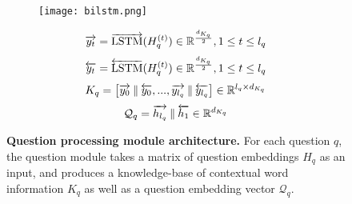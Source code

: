 \begin{figure}[htbp]
    \centering
    \begin{subfigure}[l]{0.4\textwidth}
    \texttt{[image: bilstm.png]}
    \end{subfigure}
    \begin{subfigure}[r]{0.59\textwidth}
        \begin{equation}
            \overrightarrow{y_t} = \overrightarrow{\text{LSTM}}(H_q^{(t)}) \in \mathbb{R}^\frac{d_{K_q}}{2}, 1 \leq t \leq l_q\\
            \label{equation:question_module_forward_y_t}
        \end{equation}
        \begin{equation}
            \overleftarrow{y_t} = \overleftarrow{\text{LSTM}}(H_q^{(t)}) \in \mathbb{R}^\frac{d_{K_q}}{2}, 1 \leq t \leq l_q\\
            \label{equation:question_module_backward_y_t}
        \end{equation}
        \begin{equation}
            K_q = \left [ \overrightarrow{y_0} \mathbin\Vert \overleftarrow{y_0}, ..., \overrightarrow{y_{l_q}} \mathbin\Vert \overleftarrow{y_{l_q}}\right] \in \mathbb{R}^{l_q \times d_{K_q}}\\
            \label{equation:question_module_K_q}
        \end{equation}
        \begin{equation}
            \mathcal{Q}_q = \overrightarrow{h_{l_q}}\mathbin\Vert \overleftarrow{h_{1}} \in \mathbb{R}^{d_{K_q}}
            \label{equation:question_module_Q_q}
        \end{equation}
    \end{subfigure}
    \caption[An overview of the question processing module architecture.]{\textbf{Question processing module architecture.} For each question \(q\), the question module takes a matrix of question embeddings \(H_q\) as an input, and produces a knowledge-base of contextual word information \(K_q\) as well as a question embedding vector \(\mathcal{Q}_q\).}
    \label{fig:question_module_bilstm}
\end{figure}

